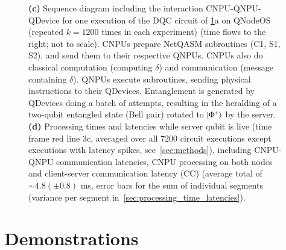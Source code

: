 \begin{figure}[htbp]
{\textbf{(c)} Sequence diagram including the interaction CNPU-QNPU-QDevice for one execution of the DQC circuit of \ref{fig:fig3}a on QNodeOS (repeated $k=1200$ times in each experiment) (time flows to the right; not to scale). CNPUs prepare NetQASM subroutines (C1, S1, S2), and send them to their respective QNPUs. CNPUs also do classical computation (computing $\delta$) and communication (message containing $\delta$). QNPUs execute subroutines, sending physical instructions to their QDevices. Entanglement is generated by QDevices doing a batch of attempts, resulting in the heralding of a two-qubit entangled state (Bell pair) rotated to $\ket{\Phi^+}$ by the server.
\textbf{(d)} Processing times and latencies while server qubit is live (time frame red line 3c, averaged over all 7200 circuit executions except executions with latency spikes, see~\cref{sec:methods}), including CNPU-QNPU communication latencies, CNPU processing on both nodes and client-server communication latency (CC) (average total of $\sim 4.8 (\pm 0.8)$ ms, error bars for the sum of individual segments (variance per segment in~\cref{sec:processing_time_latencies}).}
\label{fig:fig3}
\end{figure}


\section{Demonstrations}
